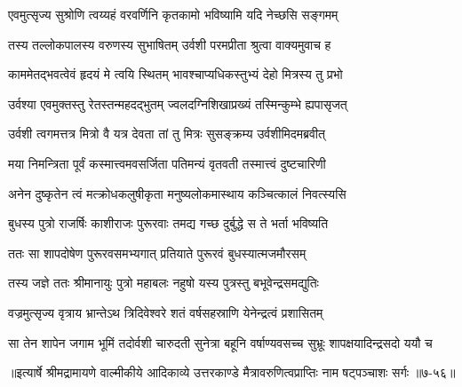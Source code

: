 \twolineshloka
{एवमुत्सृज्य सुश्रोणि त्वय्यहं वरवर्णिनि}
{कृतकामो भविष्यामि यदि नेच्छसि सङ्गमम्} %

\twolineshloka
{तस्य तल्लोकपालस्य वरुणस्य सुभाषितम्}
{उर्वशी परमप्रीता श्रुत्वा वाक्यमुवाच ह} %

\twolineshloka
{काममेतद्भवत्वेवं हृदयं मे त्वयि स्थितम्}
{भावश्चाप्यधिकस्तुभ्यं देहो मित्रस्य तु प्रभो} %

\twolineshloka
{उर्वश्या एवमुक्तस्तु रेतस्तन्महदद्भुतम्}
{ज्वलदग्निशिखाप्रख्यं तस्मिन्कुम्भे ह्यपासृजत्} %

\twolineshloka
{उर्वशी त्वगमत्तत्र मित्रो वै यत्र देवता}
{तां तु मित्रः सुसङ्क्रम्य उर्वशीमिदमब्रवीत्} %

\twolineshloka
{मया निमन्त्रिता पूर्वं कस्मात्त्वमवसर्जिता}
{पतिमन्यं वृतवती तस्मात्त्वं दुष्टचारिणी} %

\twolineshloka
{अनेन दुष्कृतेन त्वं मत्क्रोधकलुषीकृता}
{मनुष्यलोकमास्थाय कञ्चित्कालं निवत्स्यसि} %

\twolineshloka
{बुधस्य पुत्रो राजर्षिः काशीराजः पुरूरवाः}
{तमद्य गच्छ दुर्बुद्धे स ते भर्ता भविष्यति} %

\twolineshloka
{ततः सा शापदोषेण पुरूरवसमभ्यगात्}
{प्रतियाते पुरूरवं बुधस्यात्मजमौरसम्} %

\twolineshloka
{तस्य जज्ञे ततः श्रीमानायुः पुत्रो महाबलः}
{नहुषो यस्य पुत्रस्तु बभूवेन्द्रसमद्युतिः} %

\twolineshloka
{वज्रमुत्सृज्य वृत्राय भ्रान्तेऽथ त्रिदिवेश्वरे}
{शतं वर्षसहस्राणि येनेन्द्रत्वं प्रशासितम्} %

\twolineshloka
{सा तेन शापेन जगाम भूमिं तदोर्वशी चारुदती सुनेत्रा}
{बहूनि वर्षाण्यवसच्च सुभ्रूः शापक्षयादिन्द्रसदो ययौ च} %


॥इत्यार्षे श्रीमद्रामायणे वाल्मीकीये आदिकाव्ये उत्तरकाण्डे मैत्रावरुणित्वप्राप्तिः नाम षट्पञ्चाशः सर्गः ॥७-५६॥
